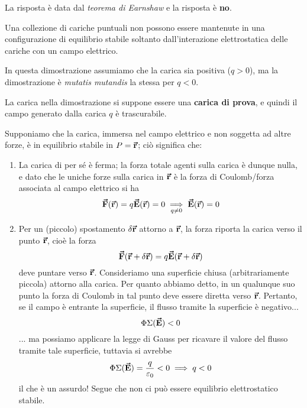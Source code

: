 La risposta è data dal \textit{teorema di Earnshaw} e la risposta è \textbf{no}.
\begin{theorema}
	Una collezione di cariche puntuali non possono essere mantenute in una configurazione di equilibrio stabile soltanto dall'interazione elettrostatica delle cariche con un campo elettrico.
\end{theorema}
In questa dimostrazione assumiamo che la carica sia positiva ($q>0$), ma la dimostrazione è \textit{mutatis mutandis} la stessa per $q<0$.
\begin{observe}
	La carica nella dimostrazione si suppone essere una \textbf{carica di prova}, e quindi il campo generato dalla carica $q$ è trascurabile.
\end{observe}
\begin{demonstration}
	Supponiamo che la carica, immersa nel campo elettrico e non soggetta ad altre forze, è in equilibrio stabile in $P=\vb*{\va{r}}$; ciò significa che:
	\begin{enumerate}
		\item La carica di per sé è ferma; la forza totale agenti sulla carica è dunque nulla, e dato che le uniche forze sulla carica in $\vb*{\va{r}}$ è la forza di Coulomb/forza associata al campo elettrico si ha
		\begin{equation*}
			\vb*{\va{F}}(\vb*{\va{r}})=q\vb*{\va{E}}(\vb*{\va{r}})=0\underset{q\neq 0}{\implies}\vb*{\va{E}}(\vb*{\va{r}})=0
		\end{equation*}
		\item Per un (piccolo) spostamento $\delta \vb*{\va{r}}$ attorno a $\vb*{\va{r}}$, la forza riporta la carica verso il punto $\vb*{\va{r}}$, cioè la forza
		\begin{equation*}
			\vb*{\va{F}}(\vb*{\va{r}}+\delta\vb*{\va{r}})=q\vb*{\va{E}}(\vb*{\va{r}}+\delta\vb*{\va{r}})
		\end{equation*}
		deve puntare verso $\vb*{\va{r}}$.
		Consideriamo una superficie chiusa (arbitrariamente piccola) attorno alla carica. Per quanto abbiamo detto, in un qualunque suo punto la forza di Coulomb in tal punto deve essere diretta verso $\vb*{\va{r}}$. Pertanto, se il campo è entrante la superficie, il flusso tramite la superficie è negativo...
		\begin{equation}
			\Phi{\Sigma}(\vb*{\va{E}})<0
		\end{equation}
		... ma possiamo applicare la legge di Gauss per ricavare il valore del flusso tramite tale superficie, tuttavia si avrebbe
		\begin{equation*}
			\Phi{\Sigma}(\vb*{\va{E}})=\frac{q}{\varepsilon_0}<0\implies q<0
		\end{equation*}
		il che è un assurdo! Segue che non ci può essere equilibrio elettrostatico stabile. 
	\end{enumerate}
\end{demonstration}
